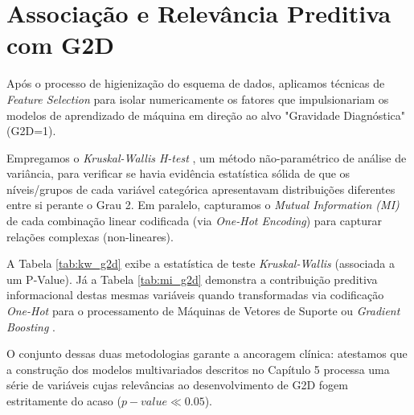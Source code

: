 \section{Associação e Relevância Preditiva com G2D}

Após o processo de higienização do esquema de dados, aplicamos técnicas de \textit{Feature Selection} para isolar numericamente os fatores que impulsionariam os modelos de aprendizado de máquina em direção ao alvo "Gravidade Diagnóstica" (G2D=1).

Empregamos o \textit{Kruskal-Wallis H-test} \cite{kruskal1952use}, um método não-paramétrico de análise de variância, para verificar se havia evidência estatística sólida de que os níveis/grupos de cada variável categórica apresentavam distribuições diferentes entre si perante o Grau 2. Em paralelo, capturamos o \textit{Mutual Information (MI)} de cada combinação linear codificada (via \textit{One-Hot Encoding}) para capturar relações complexas (non-lineares).

\begin{table}[H]
\centering
\caption{Análise de Variância (Kruskal-Wallis) para G2D}
\label{tab:kw_g2d}

\end{table}

\begin{table}[H]
\centering
\caption{Relevância Preditiva via Mutual Information (MI)}
\label{tab:mi_g2d}

\end{table}

A Tabela \ref{tab:kw_g2d} exibe a estatística de teste \textit{Kruskal-Wallis} (associada a um P-Value). 
Já a Tabela \ref{tab:mi_g2d} demonstra a contribuição preditiva informacional destas mesmas variáveis quando transformadas via codificação \textit{One-Hot} para o processamento de Máquinas de Vetores de Suporte ou \textit{Gradient Boosting} \cite{scikitlearn_MI_2024}.

\vspace{1cm}
O conjunto dessas duas metodologias garante a ancoragem clínica: atestamos que a construção dos modelos multivariados descritos no Capítulo 5 processa uma série de variáveis cujas relevâncias ao desenvolvimento de G2D fogem estritamente do acaso ($p-value \ll 0.05$).
